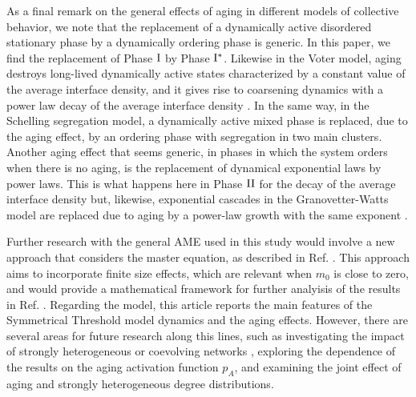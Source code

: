 	As a final remark on the general effects of aging in different models of collective behavior, we note that the replacement of a dynamically active disordered stationary phase by a dynamically ordering phase is generic. In this paper, we find the replacement of Phase ${\rm I}$ by Phase ${\rm I}^{*}$. Likewise in the Voter model, aging destroys long-lived dynamically active states characterized by a constant value of the average interface density, and it gives rise to coarsening dynamics with a power law decay of the average interface density \cite{fernandez-gracia-2011}. In the same way, in the Schelling segregation model, a dynamically active mixed phase is replaced, due to the aging effect, by an ordering phase with segregation in two main clusters. 
	Another aging effect that seems generic, in phases in which the system orders when there is no aging, is the replacement of dynamical exponential laws by power laws. This is what happens here in  Phase ${\rm II}$ for the decay of the average interface density but, likewise, exponential cascades in the Granovetter-Watts model are replaced due to aging by a power-law growth with the same exponent \cite{Abella-2022-AME}.
	
	Further research with the general AME used in this study would involve a new approach that considers the master equation, as described in Ref. \cite{peralta-2020B}. This approach aims to incorporate finite size effects, which are relevant when $m_0$ is close to zero, and would provide a mathematical framework for further analyisis of the results in Ref. \cite{Konstantin}. Regarding the model, this article reports the main features of the Symmetrical Threshold model dynamics and the aging effects. However, there are several areas for future research along this lines, such as investigating the impact of strongly heterogeneous \cite{barabasi2009scale} or coevolving networks \cite{Zimmermann,vazquez-2008}, exploring the dependence of the results on the aging activation function $p_A$, and examining the joint effect of aging and strongly heterogeneous degree distributions.